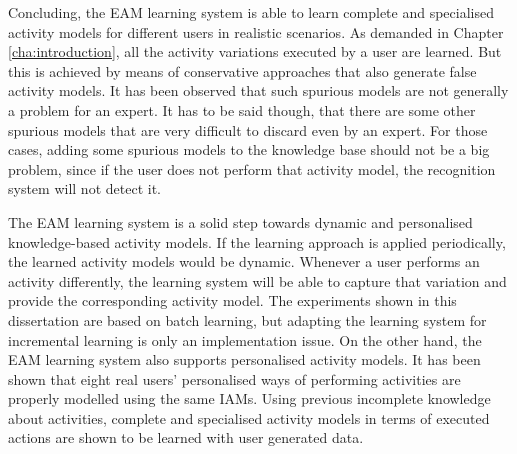 Concluding, the EAM learning system is able to learn complete and specialised activity models for different users in realistic scenarios. As demanded in Chapter \ref{cha:introduction}, all the activity variations executed by a user are learned. But this is achieved by means of conservative approaches that also generate false activity models. It has been observed that such spurious models are not generally a problem for an expert. It has to be said though, that there are some other spurious models that are very difficult to discard even by an expert. For those cases, adding some spurious models to the knowledge base should not be a big problem, since if the user does not perform that activity model, the recognition system will not detect it. 

The EAM learning system is a solid step towards dynamic and personalised knowledge-based activity models. If the learning approach is applied periodically, the learned activity models would be dynamic. Whenever a user performs an activity differently, the learning system will be able to capture that variation and provide the corresponding activity model. The experiments shown in this dissertation are based on batch learning, but adapting the learning system for incremental learning is only an implementation issue. On the other hand, the EAM learning system also supports personalised activity models. It has been shown that eight real users' personalised ways of performing activities are properly modelled using the same IAMs. Using previous incomplete knowledge about activities, complete and specialised activity models in terms of executed actions are shown to be learned with user generated data.